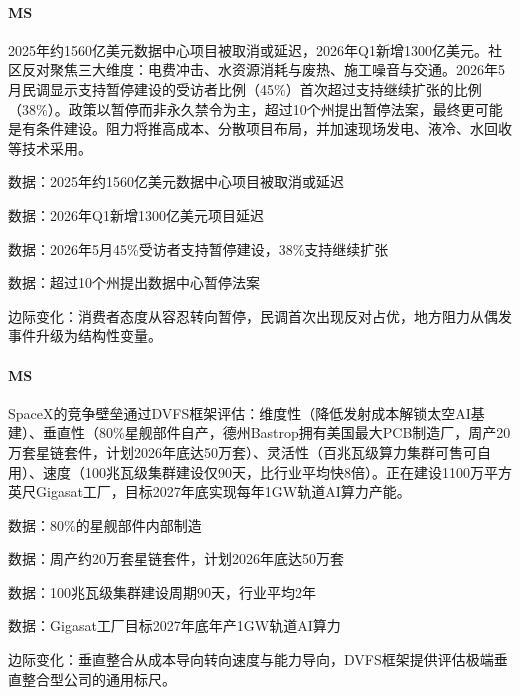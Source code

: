 \documentclass[11pt]{ctexart}
\begin{document}
\paragraph{MS} 2025年约1560亿美元数据中心项目被取消或延迟，2026年Q1新增1300亿美元。社区反对聚焦三大维度：电费冲击、水资源消耗与废热、施工噪音与交通。2026年5月民调显示支持暂停建设的受访者比例（45\%）首次超过支持继续扩张的比例（38\%）。政策以暂停而非永久禁令为主，超过10个州提出暂停法案，最终更可能是有条件建设。阻力将推高成本、分散项目布局，并加速现场发电、液冷、水回收等技术采用。
{\small\color{refgray}数据：2025年约1560亿美元数据中心项目被取消或延迟\par}
{\small\color{refgray}数据：2026年Q1新增1300亿美元项目延迟\par}
{\small\color{refgray}数据：2026年5月45\%受访者支持暂停建设，38\%支持继续扩张\par}
{\small\color{refgray}数据：超过10个州提出数据中心暂停法案\par}
{\small\color{refgray}边际变化：消费者态度从容忍转向暂停，民调首次出现反对占优，地方阻力从偶发事件升级为结构性变量。\par}
\paragraph{MS} SpaceX的竞争壁垒通过DVFS框架评估：维度性（降低发射成本解锁太空AI基建）、垂直性（80\%星舰部件自产，德州Bastrop拥有美国最大PCB制造厂，周产20万套星链套件，计划2026年底达50万套）、灵活性（百兆瓦级算力集群可售可自用）、速度（100兆瓦级集群建设仅90天，比行业平均快8倍）。正在建设1100万平方英尺Gigasat工厂，目标2027年底实现每年1GW轨道AI算力产能。
{\small\color{refgray}数据：80\%的星舰部件内部制造\par}
{\small\color{refgray}数据：周产约20万套星链套件，计划2026年底达50万套\par}
{\small\color{refgray}数据：100兆瓦级集群建设周期90天，行业平均2年\par}
{\small\color{refgray}数据：Gigasat工厂目标2027年底年产1GW轨道AI算力\par}
{\small\color{refgray}边际变化：垂直整合从成本导向转向速度与能力导向，DVFS框架提供评估极端垂直整合型公司的通用标尺。\par}
\end{document}
